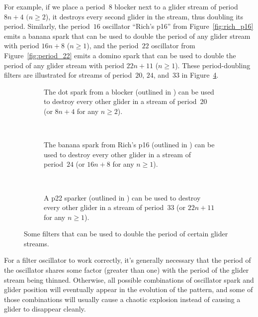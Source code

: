 For example, if we place a period~$8$ blocker next to a glider stream of period $8n+4$ $(n \geq 2$), it destroys every second glider in the stream, thus doubling its period. Similarly, the period~$16$ oscillator ``Rich's p16'' from Figure~\ref{fig:rich_p16} emits a banana spark that can be used to double the period of any glider stream with period $16n+8$ ($n \geq 1$), and the period~$22$ oscillator from Figure~\ref{fig:period_22} emits a domino spark that can be used to double the period of any glider stream with period $22n+11$ ($n \geq 1$). These period-doubling filters are illustrated for streams of period~$20$, $24$, and~$33$ in Figure~\ref{fig:glider_filters}.

\begin{figure}[!htb]
	\centering
	\begin{subfigure}{.31\textwidth}
		\centering
		\caption{The dot spark from a blocker (outlined in ) can be used to destroy every other glider in a stream of period~$20$ (or $8n+4$ for any $n \geq 2$).}
		\label{fig:blocker_glider_filter}
	\end{subfigure} \ \ \ \ %
	\begin{subfigure}{.31\textwidth}
		\centering
		\caption{The banana spark from Rich's p16 (outlined in ) can be used to destroy every other glider in a stream of period~$24$ (or $16n+8$ for any $n \geq 1$).}
		\label{fig:richs_p16_glider_filter}
	\end{subfigure} \ \ \ \ %
	\begin{subfigure}{.31\textwidth}
		\centering
		\caption{A p22 sparker (outlined in ) can be used to destroy every other glider in a stream of period~$33$ (or $22n+11$ for any $n \geq 1$).}
		\label{fig:p22_glider_filter}
	\end{subfigure}
	\caption{Some filters that can be used to double the period of certain glider streams.}\label{fig:glider_filters}
\end{figure}

For a filter oscillator to work correctly, it's generally necessary that the period of the oscillator shares some factor (greater than one) with the period of the glider stream being thinned. Otherwise, all possible combinations of oscillator spark and glider position will eventually appear in the evolution of the pattern, and some of those combinations will usually cause a chaotic explosion instead of causing a glider to disappear cleanly.

